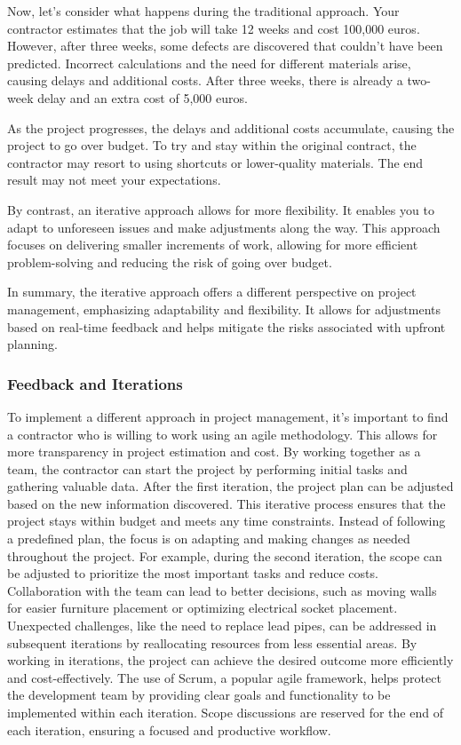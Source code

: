 Now, let's consider what happens during the traditional approach. Your
contractor estimates that the job will take 12 weeks and cost 100,000
euros. However, after three weeks, some defects are discovered that
couldn't have been predicted. Incorrect calculations and the need for
different materials arise, causing delays and additional costs. After
three weeks, there is already a two-week delay and an extra cost of
5,000 euros.

As the project progresses, the delays and additional costs accumulate,
causing the project to go over budget. To try and stay within the
original contract, the contractor may resort to using shortcuts or
lower-quality materials. The end result may not meet your expectations.

By contrast, an iterative approach allows for more flexibility. It
enables you to adapt to unforeseen issues and make adjustments along the
way. This approach focuses on delivering smaller increments of work,
allowing for more efficient problem-solving and reducing the risk of
going over budget.

In summary, the iterative approach offers a different perspective on
project management, emphasizing adaptability and flexibility. It allows
for adjustments based on real-time feedback and helps mitigate the risks
associated with upfront planning.

\subsubsection{Feedback and Iterations}

To implement a different approach in project management, it's important
to find a contractor who is willing to work using an agile methodology.
This allows for more transparency in project estimation and cost. By
working together as a team, the contractor can start the project by
performing initial tasks and gathering valuable data. After the first
iteration, the project plan can be adjusted based on the new information
discovered. This iterative process ensures that the project stays within
budget and meets any time constraints. Instead of following a predefined
plan, the focus is on adapting and making changes as needed throughout
the project. For example, during the second iteration, the scope can be
adjusted to prioritize the most important tasks and reduce costs.
Collaboration with the team can lead to better decisions, such as moving
walls for easier furniture placement or optimizing electrical socket
placement. Unexpected challenges, like the need to replace lead pipes,
can be addressed in subsequent iterations by reallocating resources from
less essential areas. By working in iterations, the project can achieve
the desired outcome more efficiently and cost-effectively. The use of
Scrum, a popular agile framework, helps protect the development team by
providing clear goals and functionality to be implemented within each
iteration. Scope discussions are reserved for the end of each iteration,
ensuring a focused and productive workflow.

